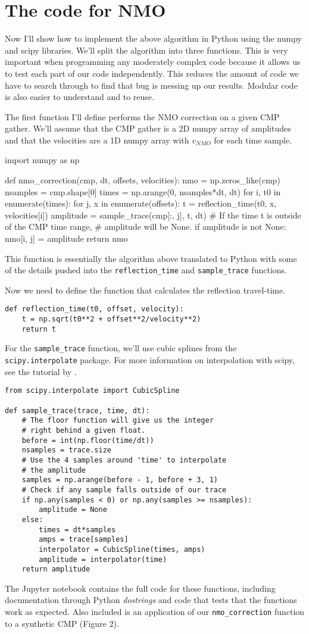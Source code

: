 \section{The code for NMO}

Now I'll show how to implement the above algorithm in Python using the numpy and scipy libraries.
We'll split the algorithm into three functions.
This is very important when programming any moderately complex code because it allows us to test each part of our code independently.
This reduces the amount of code we have to search through to find that bug is messing up our results.
Modular code is also easier to understand and to reuse.

The first function I'll define performs the NMO correction on a given CMP gather.
We'll assume that the CMP gather is a 2D numpy array of amplitudes and that the
velocities are a 1D numpy array with $v_{NMO}$ for each time sample.

    import numpy as np

    def nmo_correction(cmp, dt, offsets, velocities):
        nmo = np.zeros_like(cmp)
        nsamples = cmp.shape[0]
        times = np.arange(0, nsamples*dt, dt)
        for i, t0 in enumerate(times):
            for j, x in enumerate(offsets):
                t = reflection_time(t0, x, velocities[i])
                amplitude = sample_trace(cmp[:, j], t, dt)
                # If the time t is outside of the CMP time range,
                # amplitude will be None.
                if amplitude is not None:
                    nmo[i, j] = amplitude
        return nmo

This function is essentially the algorithm above translated to Python with some
of the details pushed into the \texttt{reflection_time} and
\texttt{sample_trace} functions.

Now we need to define the function that calculates the reflection travel-time.

\begin{verbatim}
def reflection_time(t0, offset, velocity):
    t = np.sqrt(t0**2 + offset**2/velocity**2)
    return t
\end{verbatim}

For the \texttt{sample_trace} function, we'll use cubic splines from the
\texttt{scipy.interpolate} package.
For more information on interpolation with scipy, see the tutorial by
\citet{Hall_2016}.

\begin{verbatim}
from scipy.interpolate import CubicSpline

def sample_trace(trace, time, dt):
    # The floor function will give us the integer
    # right behind a given float.
    before = int(np.floor(time/dt))
    nsamples = trace.size
    # Use the 4 samples around 'time' to interpolate
    # the amplitude
    samples = np.arange(before - 1, before + 3, 1)
    # Check if any sample falls outside of our trace
    if np.any(samples < 0) or np.any(samples >= nsamples):
        amplitude = None
    else:
        times = dt*samples
        amps = trace[samples]
        interpolator = CubicSpline(times, amps)
        amplitude = interpolator(time)
    return amplitude
\end{verbatim}

The Jupyter notebook contains the full code for these functions, including
documentation through Python \textit{dostrings} and code that tests that the
functions work as expected.
Also included is an application of our \texttt{nmo_correction} function to a
synthetic CMP (Figure 2).
